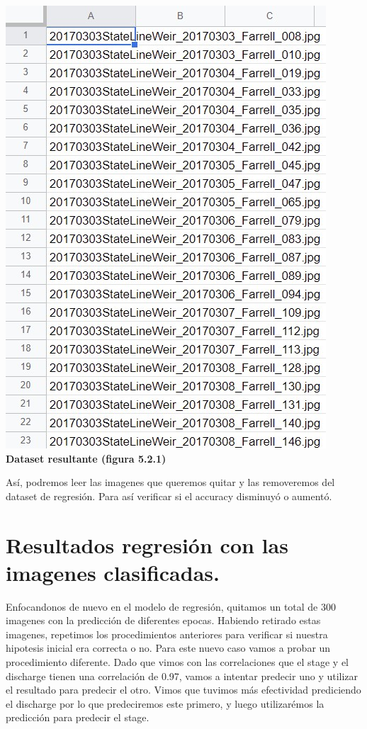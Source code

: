 \documentclass{article}
\begin{document}
        \begin{center}
                \includegraphics[scale=0.6]{images/dataset.jpg} \\

                \textbf{Dataset resultante (figura 5.2.1)}
                
        \end{center}

        Así, podremos leer las imagenes que queremos quitar y las removeremos del dataset de regresión. Para así verificar si el accuracy disminuyó o aumentó.

\section{Resultados regresión con las imagenes clasificadas.}

Enfocandonos de nuevo en el modelo de regresión, quitamos un total de 300 imagenes con la predicción de diferentes epocas. Habiendo retirado estas imagenes, repetimos los procedimientos anteriores para verificar si nuestra hipotesis inicial era correcta o no. Para este nuevo caso vamos a probar un procedimiento diferente. Dado que vimos con las correlaciones que el stage y el discharge tienen una correlación de 0.97, vamos a intentar predecir uno y utilizar el resultado para predecir el otro. Vimos que tuvimos más efectividad prediciendo el discharge por lo que predeciremos este primero, y luego utilizarémos la predicción para predecir el stage.
\end{document}
